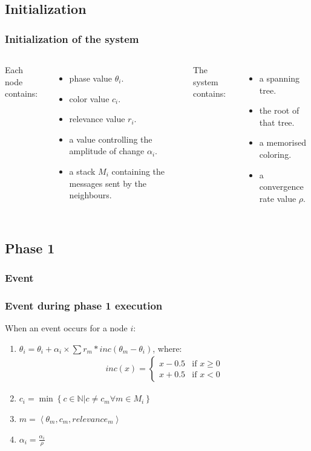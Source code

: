 \documentclass{beamer}
\begin{document}
\subsection{Initialization}
\begin{frame}
\frametitle{Initialization of the system}
\begin{columns}[t]
		Each node contains:
		\begin{itemize}
			\item phase value $\theta_i$.
			\item color value $c_i$.
			\item relevance value $r_i$.
			\item a value controlling the amplitude of change $\alpha_i$.
			\item a stack $M_i$ containing the messages sent by the neighbours.
		\end{itemize}
		
		The system contains:
		\begin{itemize}
			\item a spanning tree.
			\item the root of that tree.
			\item a memorised coloring.
			\item a convergence rate value $\rho$.
		\end{itemize}
	\end{columns}
\end{frame}

\subsection{Phase 1}

\subsubsection{Event}

\begin{frame}
\frametitle{Event during phase 1 execution}
When an event occurs for a node $i$:
\begin{enumerate}
	\item $\theta_i = \theta_i + \alpha_i \times \sum r_m * inc(\theta_m-\theta_i)$, where:
		\begin{align*}
			inc(x) = 
			\begin{cases}
				x-0.5 & \text{if } x \geq 0 \\
				x+0.5 & \text{if } x < 0
			\end{cases}
		\end{align*}
	\item $c_i = \min \left\lbrace c \in \mathbb{N} | c \neq c_m \forall m \in M_i \right\rbrace$
	\item $m = \left\langle \theta_m, c_m, relevance_m \right\rangle$
	\item $\alpha_i = \frac{\alpha_i}{\rho}$
\end{enumerate}
\end{frame}
\end{document}
